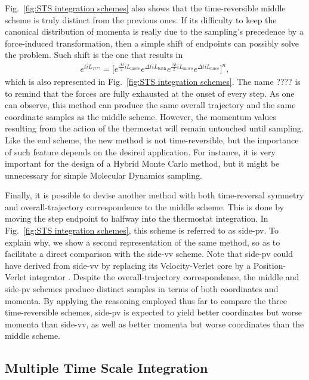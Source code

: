 \documentclass[
    journal=jctcce,
    layout=twocolumn
]{achemso}
\newcommand{\Liu}{i\!L}
\begin{document}
Fig.~\ref{fig:STS integration schemes} also shows that the time-reversible middle scheme is truly distinct from the previous ones.
If its difficulty to keep the canonical distribution of momenta is really due to the sampling's precedence by a force-induced transformation, then a simple shift of endpoints can possibly solve the problem.
Such shift is the one that results in
\begin{multline}
\label{eq:STS ???? scheme propagator}
e^{t \Liu_\mathrm{????}} = \Big[
e^{\frac{\Delta t}{2} \Liu_\mathrm{move}}
e^{\Delta t \Liu_\mathrm{bath}}
e^{\frac{\Delta t}{2} \Liu_\mathrm{move}}
e^{\Delta t \Liu_\mathrm{force}}
\Big]^{n},
\end{multline}
which is also represented in Fig.~\ref{fig:STS integration schemes}.
The name ???? is to remind that the forces are fully exhausted at the onset of every step.
As one can observe, this method can produce the same overall trajectory and the same coordinate samples as the middle scheme.
However, the momentum values resulting from the action of the thermostat will remain untouched until sampling.
Like the end scheme, the new method is not time-reversible, but the importance of such feature depends on the desired application.
For instance, it is very important for the design of a Hybrid Monte Carlo method, but it might be unnecessary for simple Molecular Dynamics sampling.

Finally, it is possible to devise another method with both time-reversal symmetry and overall-trajectory correspondence to the middle scheme.
This is done by moving the step endpoint to halfway into the thermostat integration.
In Fig.~\ref{fig:STS integration schemes}, this scheme is referred to as side-pv.
To explain why, we show a second representation of the same method, so as to facilitate a direct comparison with the side-vv scheme.
Note that side-pv could have derived from side-vv by replacing its Velocity-Verlet core by a Position-Verlet integrator \cite{Tuckerman_1992}.
Despite the overall-trajectory correspondence, the middle and side-pv schemes produce distinct samples in terms of both coordinates and momenta.
By applying the reasoning employed thus far to compare the three time-reversible schemes, side-pv is expected to yield better coordinates but worse momenta than side-vv, as well as better momenta but worse coordinates than the middle scheme.

\subsection{Multiple Time Scale Integration}
\end{document}
